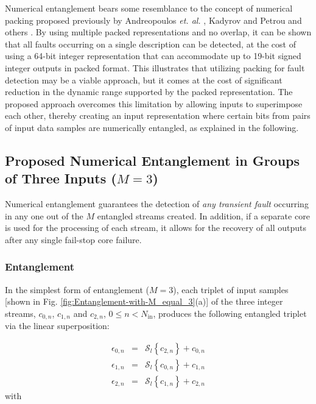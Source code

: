 \documentclass[twocolumn,english,onecolumn]{IEEEtran}
\theoremstyle{plain}
\theoremstyle{plain}
\begin{document}
Numerical entanglement bears some resemblance to the concept of numerical
packing proposed previously by Andreopoulos \emph{et. al.} \cite{anastasia2010linear,anastasia2012throughput,anam2012throughput,anastasia2010software,AnaradoIOLTS,AnaradoIOLTS15},
Kadyrov and Petrou \cite{kadyrov2006invaders} and others \cite{lin2000packed,allen1996approach}.
By using multiple packed representations and no overlap, it can be
shown \cite{AnaradoIOLTS15} that all faults occurring on a single
description can be detected, at the cost of using a 64-bit integer
representation that can accommodate up to 19-bit signed integer outputs
in packed format. This illustrates that utilizing packing for fault
detection may be a viable approach, but it comes at the cost of significant
reduction in the dynamic range supported by the packed representation.
The proposed approach overcomes this limitation by allowing inputs
to superimpose each other, thereby creating an input representation
where certain bits from pairs of input data samples are numerically
entangled, as explained in the following. 


\subsection{Proposed Numerical Entanglement in Groups of Three Inputs ($M=3$)}

Numerical entanglement guarantees the detection of \emph{any transient
fault} occurring in any one out of the $M$ entangled streams created.
In addition, if a separate core is used for the processing of each
stream, it allows for the recovery of all outputs after any single
fail-stop core failure.


\subsubsection{Entanglement}

In the simplest form of entanglement ($M=3$), each triplet of input
samples {[}shown in Fig. \ref{fig:Entanglement-with-M_equal_3}(a){]}
of the three integer streams, $c_{0,n}$, $c_{1,n}$ and $c_{2,n}$,
$0\leq n<N_{\text{in}}$, produces the following entangled triplet
via the linear superposition:

\begin{eqnarray}
\mathit{\epsilon}_{0,n} & = & \mathcal{S}_{l}\left\{ c_{2,n}\right\} +c_{0,n}\nonumber \\
\epsilon_{1,n} & = & \mathcal{S}_{l}\left\{ c_{0,n}\right\} +c_{1,n}\label{eq:entanglement_M_equal_1}\\
\epsilon_{2,n} & = & \mathcal{S}_{l}\left\{ c_{1,n}\right\} +c_{2,n}\nonumber 
\end{eqnarray}
with 
\end{document}
